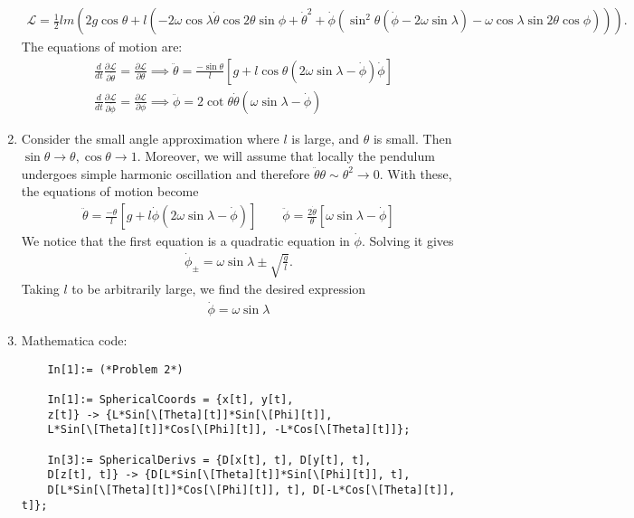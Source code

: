 \documentclass{article}
\theoremstyle{definition}
\newcommand{\p}{\partial}
\newcommand{\lag}{\mathcal{L}}
\newcommand{\f}[2]{\frac{#1}{#2}}
\newcommand{\lp}{\left(}
\newcommand{\rp}{\right)}
\newcommand{\lb}{\left[}
\newcommand{\rb}{\right]}
\begin{document}
\begin{enumerate}[label=(\alph*)]
	\begin{align*}
	\lag = \frac{1}{2} l m \left(2 g \cos\theta+l \left(-2 \omega  \cos\lambda  \dot\theta
	\cos 2 \theta \sin \phi +\dot\theta^2+\dot\phi \left(\sin^2\theta\left(\dot\phi-2 \omega  \sin \lambda \right)-\omega  \cos \lambda  \sin 2\theta  \cos \phi\right)\right)\right).
	\end{align*}
	The equations of motion are:
	\begin{align*}
	&\f{d}{dt} \f{\p \lag}{\p \dot{\theta}} = \f{\p \lag}{\p \theta} \implies 
	\boxed{\ddot\theta = \f{-\sin\theta }{l}\lb g+ l\cos\theta(2\omega\sin\lambda - \dot\phi)\dot\phi  \rb}\\
	&\f{d}{dt} \f{\p \lag}{\p \dot\phi} = \f{\p \lag}{\p \phi} \implies \boxed{\ddot\phi = 2\cot\theta \dot\theta \lp \omega\sin\lambda - \dot\phi \rp }
	\end{align*}
	
	
	\item Consider the small angle approximation where $l$ is large, and $\theta$ is small. Then $\sin\theta \to \theta, \cos\theta \to 1$. Moreover, we will assume that locally the pendulum undergoes simple harmonic oscillation and therefore $\ddot\theta \theta \sim \theta^2 \to 0$. With these, the equations of motion become
	\begin{align*}
	\boxed{\ddot\theta = \f{-\theta  }{l}\lb g+ l\dot\phi (2\omega\sin\lambda - \dot\phi) \rb} 
	\quad \quad 
	\boxed{\ddot\phi = \f{2\dot\theta }{\theta} \lb \omega\sin\lambda - \dot\phi \rb }
	\end{align*}
	We notice that the first equation is a quadratic equation in $\dot\phi$. Solving it gives
	\begin{align*}
	\dot\phi_\pm = \omega \sin\lambda \pm \sqrt{\f{g}{l}}.
	\end{align*}
	Taking $l$ to be arbitrarily large, we find the desired expression
	\begin{align*}
	\boxed{\dot\phi = \omega\sin\lambda}
	\end{align*}
	
	
	\item Mathematica code:
	\begin{lstlisting}
	In[1]:= (*Problem 2*)
	
	In[1]:= SphericalCoords = {x[t], y[t], 
	z[t]} -> {L*Sin[\[Theta][t]]*Sin[\[Phi][t]], 
	L*Sin[\[Theta][t]]*Cos[\[Phi][t]], -L*Cos[\[Theta][t]]};
	
	In[3]:= SphericalDerivs = {D[x[t], t], D[y[t], t], 
	D[z[t], t]} -> {D[L*Sin[\[Theta][t]]*Sin[\[Phi][t]], t], 
	D[L*Sin[\[Theta][t]]*Cos[\[Phi][t]], t], D[-L*Cos[\[Theta][t]], t]};
	

\end{lstlisting}
\end{enumerate}
\end{document}
